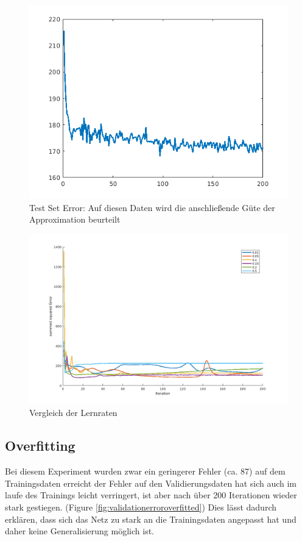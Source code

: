 \documentclass{hbrs-ecta-report}
\begin{document}
\begin{figure}[h]
	\centering
	\includegraphics[width=\linewidth]{img/testError}
	\caption{Test Set Error: Auf diesen Daten wird die anschließende Güte der Approximation beurteilt}
	\label{fig:testerror}
\end{figure}

\begin{figure}[h]
	\centering
	\includegraphics[width=\linewidth]{img/learing_rate_comparison}
	\caption{Vergleich der Lernraten}
	\label{fig:learingratecomparison}
\end{figure}

\FloatBarrier

\subsection{Overfitting}
Bei diesem Experiment wurden zwar ein geringerer Fehler (ca. 87) auf dem Trainingsdaten erreicht der Fehler auf den Validierungsdaten hat sich auch im laufe des Trainings leicht verringert, ist aber nach über 200 Iterationen wieder stark gestiegen. (Figure \ref{fig:validationerroroverfitted}) 
Dies lässt dadurch erklären, dass sich das Netz zu stark an die Trainingsdaten angepasst hat und daher keine Generalisierung möglich ist.
\end{document}
